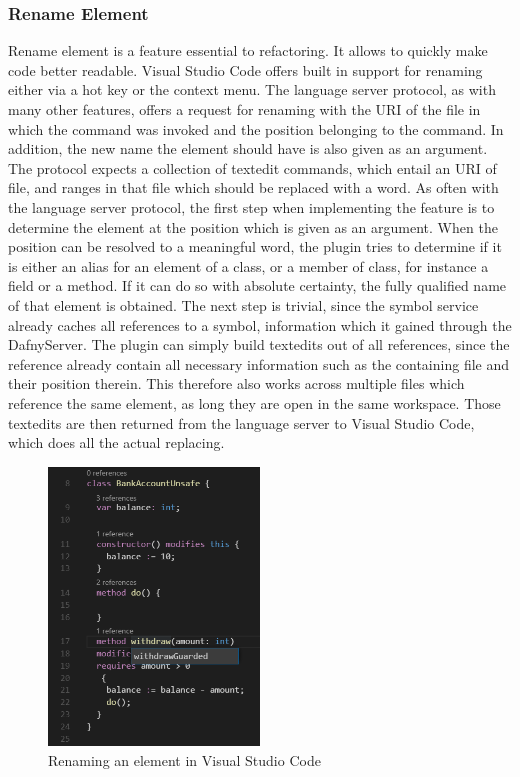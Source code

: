 \subsubsection{Rename Element} \label{renameelement}
Rename element is a feature essential to refactoring. It allows to quickly make code better readable. Visual Studio Code offers built in support for renaming either via a hot key or the context menu. \newline
The language server protocol, as with many other features, offers a request for renaming with the URI of the file in which the command was invoked and the position belonging to the command. In addition, the new name the element should have is also given as an argument. The protocol expects a collection of textedit commands, which entail an URI of file, and ranges in that file which should be replaced with a word. \newline
As often with the language server protocol, the first step when implementing the feature is to determine the element at the position which is given as an argument. When the position can be resolved to a meaningful word, the plugin tries to determine if it is either an alias for an element of a class, or a member of class, for instance a field or a method. If it can do so with absolute certainty, the fully qualified name of that element is obtained. The next step is trivial, since the symbol service already caches all references to a symbol, information which it gained through the DafnyServer. The plugin can simply build textedits out of all references, since the reference already contain all necessary information such as the containing file and their position therein. This therefore also works across multiple files which reference the same element, as long they are open in the same workspace. Those textedits are then returned from the language server to Visual Studio Code, which does all the actual replacing. \newline
  \begin{figure}[H]
 	\centering
 	\includegraphics[width=0.5\textwidth]{img/rename}
 	\caption{Renaming an element in Visual Studio Code}
 	\label{fig:rename}
 \end{figure}
